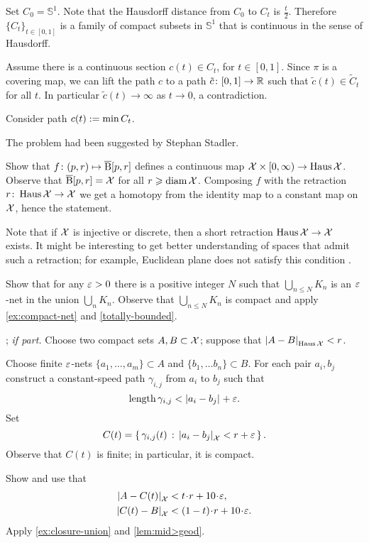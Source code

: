 Set $C_0=\mathbb{S}^1$.
Note that the Hausdorff distance from $C_0$ to $C_t$ is $\tfrac t2$.
Therefore $\{C_t\}_{t\in[0,1]}$ is a family of compact subsets in $\mathbb{S}^1$ that is continuous in the sense of Hausdorff.

Assume there is a continuous section $c(t)\in C_t$, for $t\in [0,1]$.
Since $\pi$ is a covering map,
we can lift the path $c$ to a path $\tilde c\colon[0,1]\to \mathbb{R}$ such that $\tilde c(t)\in \tilde C_t$ for all $t$.
In particular $\tilde c(t)\to\infty$ as $t\to0$,
a contradiction.

Consider path $c(t)\mathrel{:=}\min C_t$.

 The problem had been suggested by Stephan Stadler.

Show that $f\colon(p,r)\mapsto \overline{\mathrm{B}}{}[p,r]$ defines a continuous map $\spc{X}\z\times[0,\infty)\to \Haus\spc{X}$.
Observe that $\overline{\mathrm{B}}{}[p,r]=\mathcal{X}$ for all $r\geqslant\operatorname{\rm diam}\nolimits\mathcal{X}$.
Composing $f$ with the retraction $r\colon\operatorname{\rm Haus}\nolimits\mathcal{X}\to \mathcal{X}$ we get a homotopy from the identity map to a constant map on $\mathcal{X}$, hence the statement.

Note that if $\mathcal{X}$ is injective or discrete, then a short retraction $\operatorname{\rm Haus}\nolimits\mathcal{X}\to \mathcal{X}$ exists.
It might be interesting to get better understanding of spaces that admit such a retraction;
for example, Euclidean plane does not satisfy this condition \cite{petrunin-2022-MO-center, przeslawski-yost}.

Show that for any $\varepsilon>0$ there is a positive integer $N$ such that $\bigcup_{n\le N} K_n$ is an $\varepsilon$-net in the union $\bigcup_{n} K_n$.
Observe that $\bigcup_{n\le N} K_n$
is compact and apply \ref{ex:compact-net} and \ref{totally-bounded}.

\parbf{\ref{ex:Haus-length}}; \textit{if part.}
Choose two compact sets $A,B\subset \mathcal{X}$;
suppose that $\dist{A}{B}{\Haus\spc{X}}<r$.

Choose finite $\varepsilon$-nets $\{a_1,\dots,a_m\}\subset A$ and $\{b_1,\dots b_n\}\subset B$.
For each pair $a_i,b_j$ construct a constant-speed path $\gamma_{i,j}$ from $a_i$ to $b_j$ such that 
\[\length \gamma_{i,j}<\dist{a_i}{b_j}{}+\eps.\]
Set 
\[C(t)=\set{\gamma_{i,j}(t)}{\dist{a_i}{b_j}{\spc{X}}<r+\eps}.\]
Observe that $C(t)$ is finite; in particular, it is compact.

Show and use that 
\begin{align*}
\dist{A}{C(t)}{\spc{X}}&<t\cdot r+10\cdot\eps,
\\
\dist{C(t)}{B}{\spc{X}}&<(1-t)\cdot r+10\cdot\eps.
\end{align*}
Apply \ref{ex:closure-union} and \ref{lem:mid>geod}.

